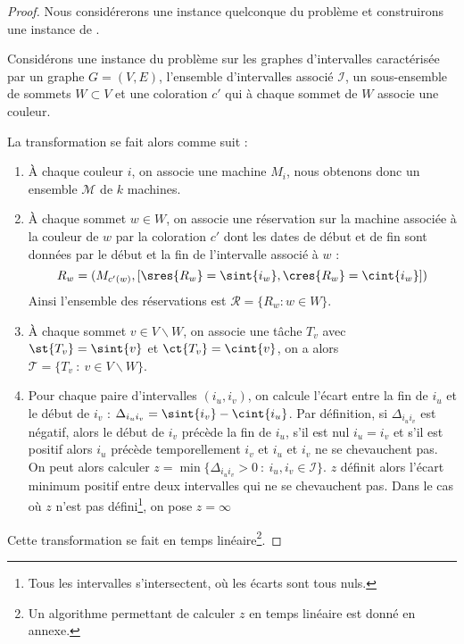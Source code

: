 \begin{proof}
Nous considérerons une instance quelconque du problème \precolor{} et construirons une instance de
\fischedpi{}.

Considérons une instance du problème \precolor{} sur les graphes d'intervalles caractérisée
par un graphe $G = (V,E)$, l'ensemble d'intervalles associé $\mathcal{I}$, un
sous-ensemble de sommets $W \subset V$ et une coloration $c'$ qui à chaque sommet de $W$ associe
une couleur. 

La transformation se fait alors comme suit : 
\begin{enumerate}
    \item À chaque couleur $i$, on associe une machine $M_i$, nous obtenons donc un ensemble
        $\mathcal{M}$ de $k$ machines.
    \item À chaque sommet $w \in W$, on associe une réservation sur la machine associée à la
        couleur de $w$ par la coloration $c'$ dont les dates de début et de fin sont données par
        le début et la fin de l'intervalle associé à $w$ : \[
            R_w = (M_{c'(w)}, [\sres{R_w} = \sint{i_w}, \cres{R_w} = \cint{i_w}])
        \]
        Ainsi l'ensemble des réservations est $\mathcal{R} = \{R_w : w \in W\}$.
    \item À chaque sommet $v \in V \backslash W$, on associe une tâche $T_v$ avec $\st{T_v} =
        \sint{v}$ et $\ct{T_v} = \cint{v}$, on a alors $\mathcal{T} = \{T_v\ \colon\ v \in V
        \backslash W\}$.
    \item Pour chaque paire d'intervalles $(i_u, i_v)$, on calcule l'écart entre la fin de $i_u$ et
        le début de $i_v$ : $\Delta_{i_ui_v} = \sint{i_v} - \cint{i_u}$. Par définition, si
        $\Delta_{i_ui_v}$ est négatif, alors le début de $i_v$ précède la fin de $i_u$, s'il est nul
        $i_u = i_v$ et s'il est positif alors $i_u$ précède temporellement $i_v$ et $i_u$ et $i_v$
        ne se chevauchent pas. On peut alors calculer $z = \min\{\Delta_{i_ui_v} > 0\ :\ i_u, i_v
        \in \mathcal{I}\}$. $z$ définit alors l'écart minimum positif entre deux intervalles qui ne
        se chevauchent pas.
        Dans le cas où $z$ n'est pas
        défini\footnote{Tous les intervalles s'intersectent, où les écarts sont tous nuls.}, on
        pose $z = \infty$
\end{enumerate}

Cette transformation se fait en temps linéaire\footnote{Un algorithme permettant de calculer $z$ en
temps linéaire est donné en annexe.}.


\end{proof}
